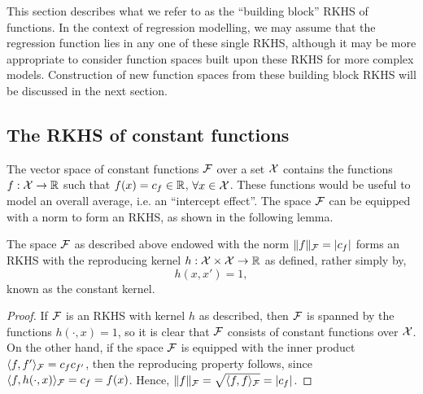 This section describes what we refer to as the ``building block'' RKHS of functions.
In the context of regression modelling, we may assume that the regression function lies in any one of these single RKHS, although it may be more appropriate to consider function spaces built upon these RKHS for more complex models.
Construction of new function spaces from these building block RKHS will be discussed in the next section.

\subsection{The RKHS of constant functions}

The vector space of constant functions ${\mathcal F}$ over a set ${\mathcal X}$ contains the functions $f:{\mathcal X} \to \mathbb{R}$ such that $f(x) = c_f \in \mathbb{R}$, $\forall x \in {\mathcal X}$.
These functions would be useful to model an overall average, i.e. an ``intercept effect''.
The space ${\mathcal F}$ can be equipped with a norm to form an RKHS, as shown in the following lemma.

\begin{proposition}[RKHS of constant functions]
  The space ${\mathcal F}$ as described above endowed with the norm $\lVert f\rVert_{\mathcal F} = \vert c_f \vert$ forms an RKHS with the reproducing kernel $h:{\mathcal X}\times{\mathcal X}\to\mathbb{R}$ as defined, rather simply by,
  \[
    h(x,x') = 1,
  \]
  known as the constant kernel.
\end{proposition}

\begin{proof}
  If ${\mathcal F}$ is an RKHS with kernel $h$ as described, then ${\mathcal F}$ is spanned by the  functions $h(\cdot,x) = 1$, so it is clear that ${\mathcal F}$ consists of constant functions over ${\mathcal X}$.
  On the other hand, if the space ${\mathcal F}$ is equipped with the inner product $\langle f,f'\rangle_{\mathcal F} = c_f c_{f'}$, then the reproducing property follows, since $\langle f,h(\cdot,x)\rangle_{\mathcal F} = c_f = f(x)$.
  Hence, $\lVert f\rVert_{\mathcal F} = \sqrt{\langle f,f\rangle_{\mathcal F}} = \vert c_f \vert$.
\end{proof}



